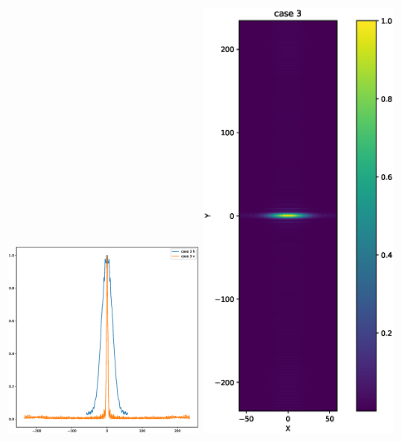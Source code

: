 \documentclass{iucr}              %
\begin{document}
\begin{figure}
    \includegraphics[width=0.45\textwidth]{figures/case_3_profiles.eps}
    \includegraphics[width=0.45\textwidth]{figures/case_3_image.eps}
    

\end{figure}
\end{document}
